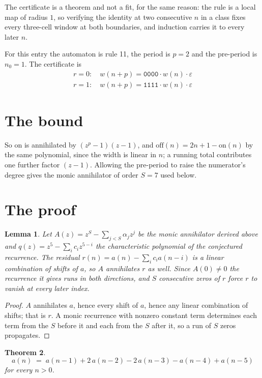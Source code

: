 \documentclass[11pt,a4paper]{article}
\theoremstyle{plain}
\newtheorem{theorem}{Theorem}
\newtheorem{lemma}[theorem]{Lemma}
\theoremstyle{definition}
\begin{document}
The certificate is a theorem and not a fit, for the same reason: the rule is a local map of
radius $1$, so verifying the identity at two consecutive $n$ in a class fixes every three-cell
window at both boundaries, and induction carries it to every later $n$.

For this entry the automaton is rule 11, the period is $p=2$ and the pre-period is $n_0=1$.
The certificate is
\begin{gather*}
r=0:\quad w(n+p) = \texttt{0000} \cdot w(n) \cdot \varepsilon \\
r=1:\quad w(n+p) = \texttt{1111} \cdot w(n) \cdot \varepsilon
\end{gather*}

\section{The bound}

So
$\mathrm{on}$ is annihilated by $(z^p-1)(z-1)$, and $\mathrm{off}(n)=2n+1-\mathrm{on}(n)$ by
the same polynomial, since the width is linear in $n$; a running total contributes one further
factor $(z-1)$. Allowing the pre-period to raise the numerator's degree gives the monic
annihilator of order $S=7$ used below.

\section{The proof}

\begin{lemma}\label{lem:crit}
Let $A(z)=z^S-\sum_{j<S}\alpha_jz^{j}$ be the monic annihilator derived above and
$q(z)=z^{5}-\sum_ic_iz^{5-i}$ the characteristic polynomial of the conjectured
recurrence. The residual $r(n)=a(n)-\sum_ic_ia(n-i)$ is a linear combination of shifts of $a$,
so $A$ annihilates $r$ as well. Since $A(0)\ne0$ the recurrence it gives runs in both
directions, and $S$ consecutive zeros of $r$ force $r$ to vanish at every later index.
\end{lemma}

\begin{proof}
$A$ annihilates $a$, hence every shift of $a$, hence any linear combination of shifts; that is
$r$. A monic recurrence with nonzero constant term determines each term from the $S$ before it
and each from the $S$ after it, so a run of $S$ zeros propagates.
\end{proof}

\begin{theorem}
\[
a(n)\;=\;a(n-1) + 2\,a(n-2) - 2\,a(n-3) - a(n-4) + a(n-5)
\]
for every $n>0$.
\end{theorem}
\end{document}
